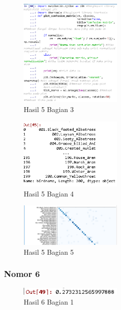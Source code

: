 
\begin{figure}[H]
\centerline{\includegraphics[width=5cm]{figures/1174079/3/praktek23.PNG}}
\caption{Hasil 5 Bagian 3}
\label{labelgambar}
\end{figure}


\begin{figure}[H]
\centerline{\includegraphics[width=5cm]{figures/1174079/3/praktek24.PNG}}
\caption{Hasil 5 Bagian 4}
\label{labelgambar}
\end{figure}


\begin{figure}[H]
\centerline{\includegraphics[width=5cm]{figures/1174079/3/praktek25.PNG}}
\caption{Hasil 5 Bagian 5}
\label{labelgambar}
\end{figure}

\subsubsection{Nomor 6}
\hfill\break

\begin{figure}[H]
\centerline{\includegraphics[width=5cm]{figures/1174079/3/praktek26.PNG}}
\caption{Hasil 6 Bagian 1}
\label{labelgambar}
\end{figure}

